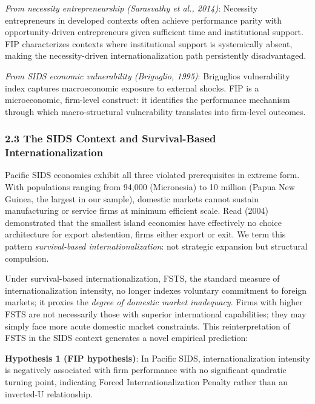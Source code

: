 \documentclass[12pt,a4paper]{article}
\begin{document}
\emph{From necessity entrepreneurship (Sarasvathy et al., 2014)}:
Necessity entrepreneurs in developed contexts often achieve performance
parity with opportunity-driven entrepreneurs given sufficient time and
institutional support. FIP characterizes contexts where institutional
support is systemically absent, making the necessity-driven
internationalization path persistently disadvantaged.

\emph{From SIDS economic vulnerability (Briguglio, 1995)}:
Briguglio\textquotesingle s vulnerability index captures macroeconomic
exposure to external shocks. FIP is a microeconomic, firm-level
construct: it identifies the performance mechanism through which
macro-structural vulnerability translates into firm-level outcomes.

\hypertarget{23-the-sids-context-and-survival-based-internationalization}{%
\subsubsection{2.3 The SIDS Context and Survival-Based
Internationalization}\label{23-the-sids-context-and-survival-based-internationalization}}

Pacific SIDS economies exhibit all three violated prerequisites in
extreme form. With populations ranging from 94,000 (Micronesia) to 10
million (Papua New Guinea, the largest in our sample), domestic markets
cannot sustain manufacturing or service firms at minimum efficient
scale. Read (2004) demonstrated that the smallest island economies have
effectively no choice architecture for export abstention, firms either
export or exit. We term this pattern \emph{survival-based
internationalization}: not strategic expansion but structural
compulsion.

Under survival-based internationalization, FSTS, the standard measure of
internationalization intensity, no longer indexes voluntary commitment
to foreign markets; it proxies the \emph{degree of domestic market
inadequacy}. Firms with higher FSTS are not necessarily those with
superior international capabilities; they may simply face more acute
domestic market constraints. This reinterpretation of FSTS in the SIDS
context generates a novel empirical prediction:

\textbf{Hypothesis 1 (FIP hypothesis)}: In Pacific SIDS,
internationalization intensity is negatively associated with firm
performance with no significant quadratic turning point, indicating
Forced Internationalization Penalty rather than an inverted-U
relationship.
\end{document}
